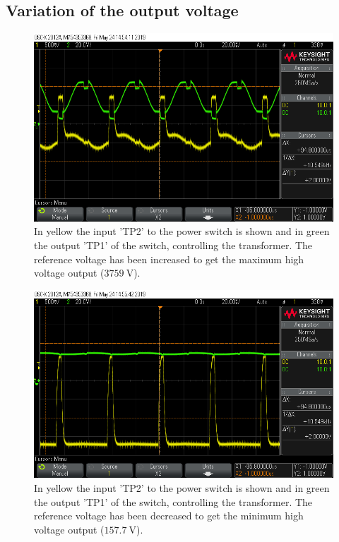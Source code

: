 \subsection{Variation of the output voltage}


\begin{figure}[H]
\centering
\includegraphics[width=.9\textwidth]{figures/scope_21.png}
\caption{In yellow the input 'TP2' to the power switch is shown and in green the output 'TP1' of the switch, controlling the transformer. The reference voltage has been increased to get the maximum high voltage output ($\SI{3759}{\volt}$).}
\label{fig:scope_21}
\end{figure}


\begin{figure}[H]
\centering
\includegraphics[width=.9\textwidth]{figures/scope_22.png}
\caption{In yellow the input 'TP2' to the power switch is shown and in green the output 'TP1' of the switch, controlling the transformer. The reference voltage has been decreased to get the minimum high voltage output ($\SI{157.7}{\volt}$).}
\label{fig:scope_22}
\end{figure}

